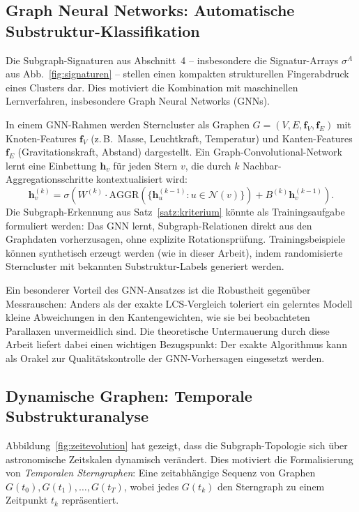 ﻿\documentclass[a4paper,12pt]{report}
\theoremstyle{definition}
\begin{document}
\subsection{Graph Neural Networks: Automatische Substruktur-Klas\-si\-fikation}

Die Subgraph-Signaturen aus Abschnitt~4 -- insbesondere die Signatur-Arrays $\sigma^A$ aus Abb.~\ref{fig:signaturen} -- stellen einen kompakten strukturellen Fingerabdruck eines Clusters dar. Dies motiviert die Kombination mit maschinellen Lernverfahren, insbesondere Graph Neural Networks (GNNs).

In einem GNN-Rahmen werden Sterncluster als Graphen $G = (V, E, \mathbf{f}_V, \mathbf{f}_E)$ mit Knoten-Features $\mathbf{f}_V$ (z.\,B.\ Masse, Leuchtkraft, Temperatur) und Kanten-Features $\mathbf{f}_E$ (Gravitationskraft, Abstand) dargestellt. Ein Graph-Convolutional-Network lernt eine Einbettung $\mathbf{h}_v$ für jeden Stern $v$, die durch $k$ Nachbar-Aggregationsschritte kontextualisiert wird:
\[
\mathbf{h}_v^{(k)} = \sigma\!\left(W^{(k)} \cdot \mathrm{AGGR}\!\left(\{\mathbf{h}_u^{(k-1)} : u \in \mathcal{N}(v)\}\right) + B^{(k)} \mathbf{h}_v^{(k-1)}\right).
\]
Die Subgraph-Erkennung aus Satz~\ref{satz:kriterium} könnte als Trainingsaufgabe formuliert werden: Das GNN lernt, Subgraph-Relationen direkt aus den Graphdaten vorherzusagen, ohne explizite Rotationsprüfung. Trainingsbeispiele können synthetisch erzeugt werden (wie in dieser Arbeit), indem randomisierte Sterncluster mit bekannten Substruktur-Labels generiert werden.

Ein besonderer Vorteil des GNN-Ansatzes ist die Robustheit gegenüber Messrauschen: Anders als der exakte LCS-Vergleich toleriert ein gelerntes Modell kleine Abweichungen in den Kantengewichten, wie sie bei beobachteten Parallaxen unvermeidlich sind. Die theoretische Untermauerung durch diese Arbeit liefert dabei einen wichtigen Bezugspunkt: Der exakte Algorithmus kann als Orakel zur Qualitätskontrolle der GNN-Vorhersagen eingesetzt werden.

\subsection{Dynamische Graphen: Temporale Substrukturanalyse}

Abbildung~\ref{fig:zeitevolution} hat gezeigt, dass die Subgraph-Topologie sich über astronomische Zeitskalen dynamisch verändert. Dies motiviert die Formalisierung von \emph{Temporalen Sterngraphen}: Eine zeitabhängige Sequenz von Graphen $G(t_0), G(t_1), \ldots, G(t_T)$, wobei jedes $G(t_k)$ den Sterngraph zu einem Zeitpunkt $t_k$ repräsentiert.
\end{document}
